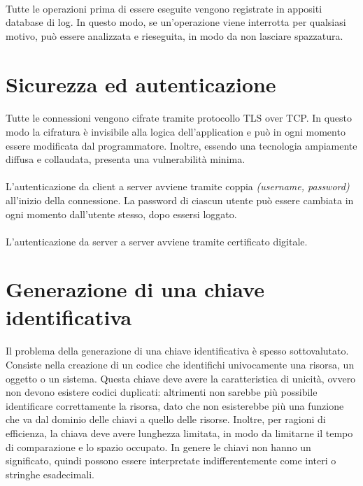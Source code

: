 \documentclass{article}
\begin{document}
\paragraph{} Tutte le operazioni prima di essere eseguite vengono registrate in appositi database di log. In questo modo, se un'operazione viene interrotta per qualsiasi motivo, può essere analizzata e rieseguita, in modo da non lasciare spazzatura. 





\section{Sicurezza ed autenticazione}

\paragraph{} Tutte le connessioni vengono cifrate tramite protocollo TLS over TCP. In questo modo la cifratura è invisibile alla logica dell'application e può in ogni momento essere modificata dal programmatore. Inoltre, essendo una tecnologia ampiamente diffusa e collaudata, presenta una vulnerabilità minima. 

\paragraph{} L'autenticazione da client a server avviene tramite coppia \emph{(username, password)} all'inizio della connessione. La password di ciascun utente può essere cambiata in ogni momento dall'utente stesso, dopo essersi loggato. 

\paragraph{} L'autenticazione da server a server avviene tramite certificato digitale. 


\section{Generazione di una chiave identificativa}

\paragraph{} Il problema della generazione di una chiave identificativa è spesso sottovalutato. Consiste nella creazione di un codice che identifichi univocamente una risorsa, un oggetto o un sistema. Questa chiave deve avere la caratteristica di unicità, ovvero non devono esistere codici duplicati: altrimenti non sarebbe più possibile identificare correttamente la risorsa, dato che non esisterebbe più una funzione che va dal dominio delle chiavi a quello delle risorse. Inoltre, per ragioni di efficienza, la chiava deve avere lunghezza limitata, in modo da limitarne il tempo di comparazione e lo spazio occupato. In genere le chiavi non hanno un significato, quindi possono essere interpretate indifferentemente come interi o stringhe esadecimali.  
\end{document}
